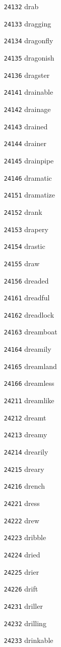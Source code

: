 \documentclass[twoside,11pt]{article}
\begin{document}
\begin{multicols}{5}
\begin{enumerate}
\item[\texttt{24132}] drab
\item[\texttt{24133}] dragging
\item[\texttt{24134}] dragonfly
\item[\texttt{24135}] dragonish
\item[\texttt{24136}] dragster
\item[\texttt{24141}] drainable
\item[\texttt{24142}] drainage
\item[\texttt{24143}] drained
\item[\texttt{24144}] drainer
\item[\texttt{24145}] drainpipe
\item[\texttt{24146}] dramatic
\item[\texttt{24151}] dramatize
\item[\texttt{24152}] drank
\item[\texttt{24153}] drapery
\item[\texttt{24154}] drastic
\item[\texttt{24155}] draw
\item[\texttt{24156}] dreaded
\item[\texttt{24161}] dreadful
\item[\texttt{24162}] dreadlock
\item[\texttt{24163}] dreamboat
\item[\texttt{24164}] dreamily
\item[\texttt{24165}] dreamland
\item[\texttt{24166}] dreamless
\item[\texttt{24211}] dreamlike
\item[\texttt{24212}] dreamt
\item[\texttt{24213}] dreamy
\item[\texttt{24214}] drearily
\item[\texttt{24215}] dreary
\item[\texttt{24216}] drench
\item[\texttt{24221}] dress
\item[\texttt{24222}] drew
\item[\texttt{24223}] dribble
\item[\texttt{24224}] dried
\item[\texttt{24225}] drier
\item[\texttt{24226}] drift
\item[\texttt{24231}] driller
\item[\texttt{24232}] drilling
\item[\texttt{24233}] drinkable

\end{enumerate}
\end{multicols}
\end{document}
